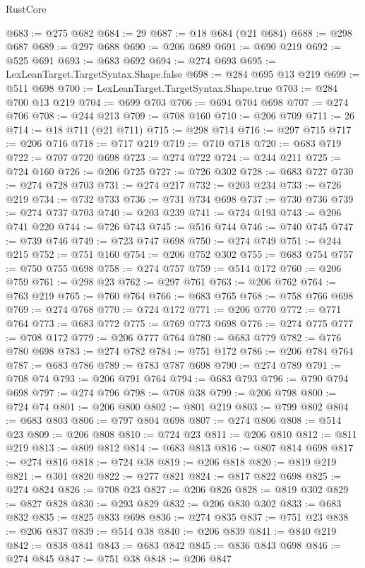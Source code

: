 \begin{lexlean}{RustCore}
\begin{coremodule}
@683 := @275 @682
@684 := 29
@687 := @18 @684 (@21 @684)
@688 := @298 @687
@689 := @297 @688
@690 := @206 @689
@691 := @690 @219
@692 := @525 @691
@693 := @683 @692
@694 := @274 @693
@695 := LexLeanTarget.TargetSyntax.Shape.false
@698 := @284 @695 @13 @219
@699 := @511 @698
@700 := LexLeanTarget.TargetSyntax.Shape.true
@703 := @284 @700 @13 @219
@704 := @699 @703
@706 := @694 @704 @698
@707 := @274 @706
@708 := @244 @213
@709 := @708 @160
@710 := @206 @709
@711 := 26
@714 := @18 @711 (@21 @711)
@715 := @298 @714
@716 := @297 @715
@717 := @206 @716
@718 := @717 @219
@719 := @710 @718
@720 := @683 @719
@722 := @707 @720 @698
@723 := @274 @722
@724 := @244 @211
@725 := @724 @160
@726 := @206 @725
@727 := @726 @302
@728 := @683 @727
@730 := @274 @728 @703
@731 := @274 @217
@732 := @203 @234
@733 := @726 @219
@734 := @732 @733
@736 := @731 @734 @698
@737 := @730 @736
@739 := @274 @737 @703
@740 := @203 @239
@741 := @724 @193
@743 := @206 @741 @220
@744 := @726 @743
@745 := @516 @744
@746 := @740 @745
@747 := @739 @746
@749 := @723 @747 @698
@750 := @274 @749
@751 := @244 @215
@752 := @751 @160
@754 := @206 @752 @302
@755 := @683 @754
@757 := @750 @755 @698
@758 := @274 @757
@759 := @514 @172
@760 := @206 @759
@761 := @298 @23
@762 := @297 @761
@763 := @206 @762
@764 := @763 @219
@765 := @760 @764
@766 := @683 @765
@768 := @758 @766 @698
@769 := @274 @768
@770 := @724 @172
@771 := @206 @770
@772 := @771 @764
@773 := @683 @772
@775 := @769 @773 @698
@776 := @274 @775
@777 := @708 @172
@779 := @206 @777 @764
@780 := @683 @779
@782 := @776 @780 @698
@783 := @274 @782
@784 := @751 @172
@786 := @206 @784 @764
@787 := @683 @786
@789 := @783 @787 @698
@790 := @274 @789
@791 := @708 @74
@793 := @206 @791 @764
@794 := @683 @793
@796 := @790 @794 @698
@797 := @274 @796
@798 := @708 @38
@799 := @206 @798
@800 := @724 @74
@801 := @206 @800
@802 := @801 @219
@803 := @799 @802
@804 := @683 @803
@806 := @797 @804 @698
@807 := @274 @806
@808 := @514 @23
@809 := @206 @808
@810 := @724 @23
@811 := @206 @810
@812 := @811 @219
@813 := @809 @812
@814 := @683 @813
@816 := @807 @814 @698
@817 := @274 @816
@818 := @724 @38
@819 := @206 @818
@820 := @819 @219
@821 := @301 @820
@822 := @277 @821
@824 := @817 @822 @698
@825 := @274 @824
@826 := @708 @23
@827 := @206 @826
@828 := @819 @302
@829 := @827 @828
@830 := @293 @829
@832 := @206 @830 @302
@833 := @683 @832
@835 := @825 @833 @698
@836 := @274 @835
@837 := @751 @23
@838 := @206 @837
@839 := @514 @38
@840 := @206 @839
@841 := @840 @219
@842 := @838 @841
@843 := @683 @842
@845 := @836 @843 @698
@846 := @274 @845
@847 := @751 @38
@848 := @206 @847

\end{coremodule}
\end{lexlean}
